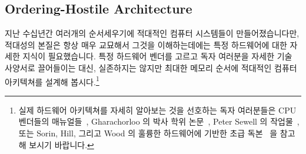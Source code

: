 \subsection{Ordering-Hostile Architecture}
\label{sec:app:whymb:Ordering-Hostile Architecture}

지난 수십년간 여러개의 순서세우기에 적대적인 컴퓨터 시스템들이
만들어졌습니다만, 적대성의 본질은 항상 매우 교묘해서 그것을 이해하는데에는 특정
하드웨어에 대한 자세한 지식이 필요했습니다.
특정 하드웨어 벤더를 고르고 독자 여러분을 자세한 기술 사양서로 끌어들이는 대신,
실존하지는 않지만 최대한 메모리 순서에 적대적인 컴퓨터 아키텍쳐를 설계해
봅시다.\footnote{
	실제 하드웨어 아키텍쳐를 자세히 알아보는 것을 선호하는 독자 여러분들은
	CPU 벤더들의
	매뉴얼들~\cite{ALPHA95,AMDOpteron02,IntelItanium02v2,PowerPC94,MichaelLyons05a,SPARC94,IntelXeonV3-96a,IntelXeonV2b-96a,IBMzSeries04a},
	Gharachorloo 의 박사 학위 논문~\cite{Gharachorloo95}, Peter Sewell 의
	작업물~\cite{PeterSewell2010weakmemory}, 또는 Sorin, Hill, 그리고 Wood
	의 훌륭한 하드웨어에 기반한 초급 독본~\cite{DanielJSorin2011MemModel}
	을 참고해 보시기 바랍니다.}

